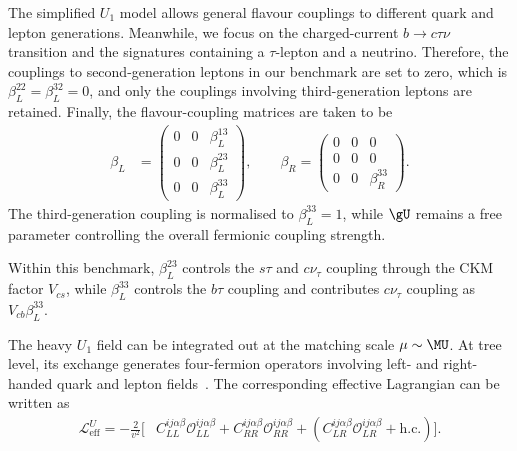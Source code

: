 The simplified $U_{1}$ model allows general flavour couplings to different quark and lepton generations. Meanwhile, we focus on the charged-current $b\rightarrow c\tau\nu$ transition and the signatures containing a $\tau$-lepton and a neutrino. Therefore, the couplings to second-generation leptons in our benchmark are set to zero, which is $\beta_{L}^{22}=\beta_{L}^{32}=0$, and only the couplings involving third-generation leptons are retained. Finally, the flavour-coupling matrices are taken to be
\begin{equation}
    \begin{aligned}
        \beta_{L} &=
        \begin{pmatrix}
            0 & 0 & \beta_{L}^{13} \\
            0 & 0 & \beta_{L}^{23} \\
            0 & 0 & \beta_{L}^{33}
        \end{pmatrix},
        \qquad
        \beta_{R} =
        \begin{pmatrix}
            0 & 0 & 0 \\
            0 & 0 & 0 \\
            0 & 0 & \beta_{R}^{33}
        \end{pmatrix}.
    \end{aligned}
    \label{eq:u1_beta_texture}
\end{equation}
The third-generation coupling is normalised to $\beta_{L}^{33}=1$, while $\gU$ remains a free parameter controlling the overall fermionic coupling strength.

Within this benchmark, $\beta_{L}^{23}$ controls the $s\tau$ and $c\nu_\tau$ coupling through the CKM factor $V_{cs}$, while $\beta_L^{33}$ controls the $b\tau$ coupling and contributes $c\nu_\tau$ coupling as $V_{cb}\beta_L^{33}$.


The heavy $U_{1}$ field can be integrated out at the matching scale $\mu\sim \MU$.
At tree level, its exchange generates four-fermion operators involving left- and right-handed quark and lepton fields~\cite{Aebischer2022}. The corresponding effective Lagrangian can be written as
\begin{align}
\mathcal{L}_{\mathrm{eff}}^{U}
=
-\frac{2}{v^{2}}
\bigg[
& C_{LL}^{ij\alpha\beta}
\mathcal{O}_{LL}^{ij\alpha\beta}
+
C_{RR}^{ij\alpha\beta}
\mathcal{O}_{RR}^{ij\alpha\beta}
+
\left(
C_{LR}^{ij\alpha\beta}
\mathcal{O}_{LR}^{ij\alpha\beta}
+
\mathrm{h.c.}
\right)
\bigg].
\label{eq:u1_low_energy_effective_lagrangian}
\end{align}

